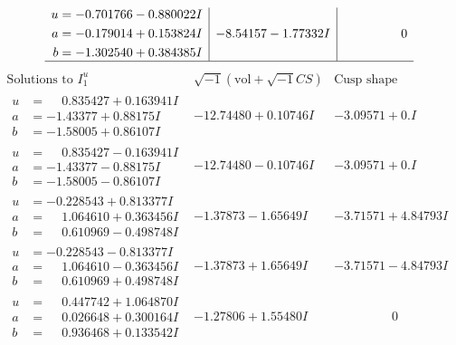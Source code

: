 \documentclass[1p]{elsarticle_modified}
\theoremstyle{definition}
\newcommand{\I}{\sqrt{-1}}
\begin{document}
$$\begin{array}{c|c|c}
\begin{aligned}
u &= -0.701766 - 0.880022 I \\
a &= -0.179014 + 0.153824 I \\
b &= -1.302540 + 0.384385 I\end{aligned}
 & -8.54157 - 1.77332 I & \phantom{-0.000000 } 0\\
 \hline 
 \end{array}$$\newpage$$\begin{array}{c|c|c}  
\text{Solutions to }I^u_{1}& \I (\text{vol} + \sqrt{-1}CS) & \text{Cusp shape}\\
 \hline 
\begin{aligned}
u &= \phantom{-}0.835427 + 0.163941 I \\
a &= -1.43377 + 0.88175 I \\
b &= -1.58005 + 0.86107 I\end{aligned}
 & -12.74480 + 0.10746 I & -3.09571 + 0. I\phantom{ +0.000000I} \\ \hline\begin{aligned}
u &= \phantom{-}0.835427 - 0.163941 I \\
a &= -1.43377 - 0.88175 I \\
b &= -1.58005 - 0.86107 I\end{aligned}
 & -12.74480 - 0.10746 I & -3.09571 + 0. I\phantom{ +0.000000I} \\ \hline\begin{aligned}
u &= -0.228543 + 0.813377 I \\
a &= \phantom{-}1.064610 + 0.363456 I \\
b &= \phantom{-}0.610969 - 0.498748 I\end{aligned}
 & -1.37873 - 1.65649 I & -3.71571 + 4.84793 I \\ \hline\begin{aligned}
u &= -0.228543 - 0.813377 I \\
a &= \phantom{-}1.064610 - 0.363456 I \\
b &= \phantom{-}0.610969 + 0.498748 I\end{aligned}
 & -1.37873 + 1.65649 I & -3.71571 - 4.84793 I \\ \hline\begin{aligned}
u &= \phantom{-}0.447742 + 1.064870 I \\
a &= \phantom{-}0.026648 + 0.300164 I \\
b &= \phantom{-}0.936468 + 0.133542 I\end{aligned}
 & -1.27806 + 1.55480 I & \phantom{-0.000000 } 0 \\ \hline\begin{aligned}

\end{aligned}
\end{array}$$
\end{document}
